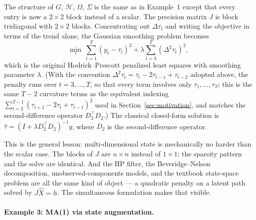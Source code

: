 \documentclass[11pt]{article}
\begin{document}
The structure of $G$, $\mathcal H$, $\Omega$, $\Sigma$ is the same as
in Example~1 except that every entry is now a $2\times 2$ block
instead of a scalar.  The precision matrix $J$ is block tridiagonal
with $2\times 2$ blocks.  Concentrating out $\Delta\tau_t$ and writing
the objective in terms of the trend alone, the Gaussian smoothing
problem becomes
\begin{equation}
\min_{\tau}\ \sum_{t=1}^T (y_t-\tau_t)^2
   + \lambda \sum_{t=3}^{T}(\Delta^2\tau_t)^2,
\label{eq:hp-pls}
\end{equation}
which is the original Hodrick--Prescott penalized least squares with
smoothing parameter $\lambda$.  (With the convention
$\Delta^2\tau_t=\tau_t-2\tau_{t-1}+\tau_{t-2}$ adopted above, the
penalty runs over $t=3,\ldots,T$, so that every term involves only
$\tau_1,\ldots,\tau_T$; this is the same $T-2$ curvature terms as the
equivalent indexing $\sum_{t=2}^{T-1}(\tau_{t+1}-2\tau_t+\tau_{t-1})^2$
used in Section~\ref{sec:motivation}, and matches the second-difference
operator $D_2^\top D_2$.)  The classical closed-form solution is
$\widehat\tau=(I+\lambda D_2^\top D_2)^{-1}y$, where $D_2$ is the
second-difference operator.

This is the general lesson: multi-dimensional state is mechanically
no harder than the scalar case.  The blocks of $J$ are $n\times n$
instead of $1\times 1$; the sparsity pattern and the solve are
identical.  And the HP filter, the Beveridge--Nelson decomposition,
unobserved-components models, and the textbook state-space problem
are all the same kind of object --- a quadratic penalty on a latent
path solved by $J\widehat X=h$.  The simultaneous formulation makes
that visible.

\paragraph{Example 3: MA(1) via state augmentation.}
\end{document}
